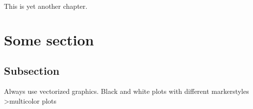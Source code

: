 This is yet another chapter.

\section{Some section}

\subsection{Subsection}
Always use vectorized graphics. Black and white plots with different markerstyles \textgreater multicolor plots 